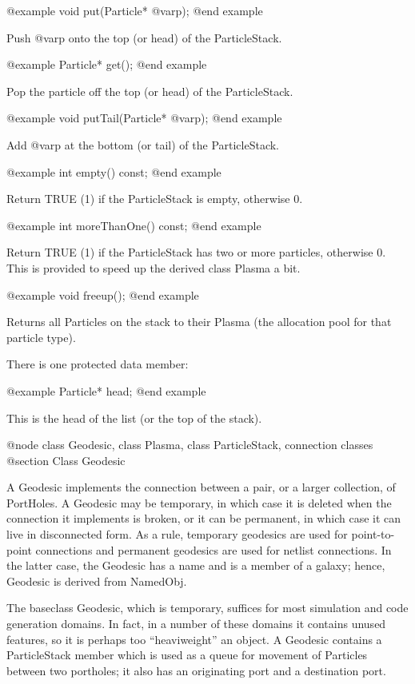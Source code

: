 @example
void put(Particle* @var{p});
@end example

Push @var{p} onto the top (or head) of the ParticleStack.

@example
Particle* get();
@end example

Pop the particle off the top (or head) of the ParticleStack.

@example
void putTail(Particle* @var{p});
@end example

Add @var{p} at the bottom (or tail) of the ParticleStack.

@example
int empty() const;
@end example

Return TRUE (1) if the ParticleStack is empty, otherwise 0.

@example
int moreThanOne() const;
@end example

Return TRUE (1) if the ParticleStack has two or more particles,
otherwise 0.  This is provided to speed up the derived class Plasma a
bit.

@example
void freeup();
@end example

Returns all Particles on the stack to their Plasma (the allocation pool
for that particle type).

There is one protected data member:

@example
Particle* head;
@end example

This is the head of the list (or the top of the stack).

@node class Geodesic, class Plasma, class ParticleStack, connection classes
@section Class Geodesic

A Geodesic implements the connection between a pair, or a larger
collection, of PortHoles.  A Geodesic may be temporary, in which case it
is deleted when the connection it implements is broken, or it can be
permanent, in which case it can live in disconnected form.  As a rule,
temporary geodesics are used for point-to-point connections and
permanent geodesics are used for netlist connections.  In the latter
case, the Geodesic has a name and is a member of a galaxy; hence,
Geodesic is derived from NamedObj.

The baseclass Geodesic, which is temporary, suffices for most simulation
and code generation domains.  In fact, in a number of these domains it
contains unused features, so it is perhaps too ``heaviweight'' an object.
A Geodesic contains a ParticleStack member which is used as a queue for
movement of Particles between two portholes; it also has an originating
port and a destination port.

